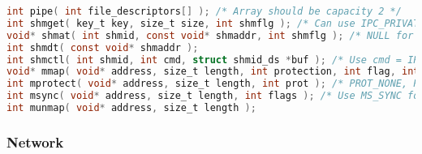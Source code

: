 \documentclass[legalpaper,10pt]{article}
\begin{document}
\begin{lstlisting}[language=C]
int pipe( int file_descriptors[] ); /* Array should be capacity 2 */
int shmget( key_t key, size_t size, int shmflg ); /* Can use IPC_PRIVATE for key, shmflag = UNIX permissions, can combine with IPC_CREAT and/or IPC_EXCL */
void* shmat( int shmid, const void* shmaddr, int shmflg ); /* NULL for shmaddr and 0 for shmflg for defaults */ 
int shmdt( const void* shmaddr );
int shmctl( int shmid, int cmd, struct shmid_ds *buf ); /* Use cmd = IPC_RMID and buf = NULL to delete */
void* mmap( void* address, size_t length, int protection, int flag, int fd, off_t offset ); /* address = NULL */
int mprotect( void* address, size_t length, int prot ); /* PROT_NONE, PROT_READ, PROT_WRITE, PROT_EXECUTE */
int msync( void* address, size_t length, int flags ); /* Use MS_SYNC for flags */
int munmap( void* address, size_t length );
\end{lstlisting}


\subsubsection*{Network}
\end{document}
